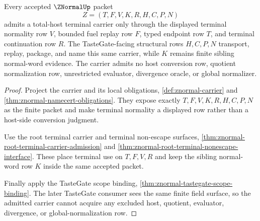 \begin{theorem}
\label{thm:znormal-total-host-terminal-carrier-admission}
Every accepted $\ZNormalUp$ packet
$$
Z=(T,F,V,K,R,H,C,P,N)
$$
admits a total-host terminal carrier only through the displayed terminal normality row $V$, bounded fuel replay row $F$, typed endpoint row $T$, and terminal continuation row $R$. The TasteGate-facing structural rows $H,C,P,N$ transport, replay, package, and name this same carrier, while $K$ remains finite sibling normal-word evidence. The carrier admits no host conversion row, quotient normalization row, unrestricted evaluator, divergence oracle, or global normalizer.
\end{theorem}
\begin{proof}
Project the carrier and its local obligations, \autoref{def:znormal-carrier} and \autoref{thm:znormal-namecert-obligations}. They expose exactly $T,F,V,K,R,H,C,P,N$ as the finite packet and make terminal normality a displayed row rather than a host-side conversion judgment.

Use the root terminal carrier and terminal non-escape surfaces, \autoref{thm:znormal-root-terminal-carrier-admission} and \autoref{thm:znormal-root-terminal-nonescape-interface}. These place terminal use on $T,F,V,R$ and keep the sibling normal-word row $K$ inside the same accepted packet.

Finally apply the TasteGate scope binding, \autoref{thm:znormal-tastegate-scope-binding}. The later TasteGate consumer sees the same finite field surface, so the admitted carrier cannot acquire any excluded host, quotient, evaluator, divergence, or global-normalization row.
\end{proof}

